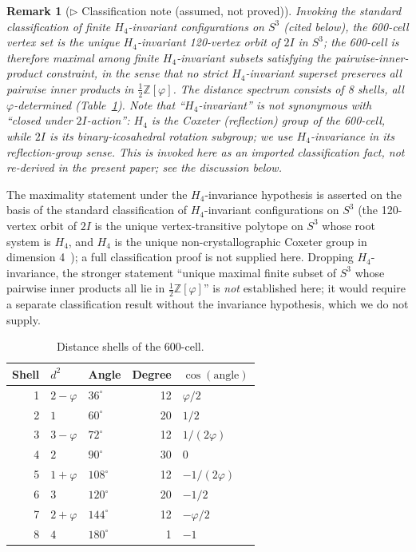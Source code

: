 \documentclass[12pt]{article}
\newtheorem{remark}[theorem]{Remark}
\newcommand{\phig}{\varphi}
\begin{document}
\begin{remark}[$\triangleright$ Classification note (assumed, not proved)]\label{cor:phi_determined}
Invoking the standard classification of finite $H_4$-invariant configurations on $S^3$ (cited below), the 600-cell vertex set is the \emph{unique $H_4$-invariant} 120-vertex orbit of $2I$ in $S^3$; the 600-cell is therefore maximal among finite $H_4$-invariant subsets satisfying the pairwise-inner-product constraint, in the sense that no strict $H_4$-invariant superset preserves all pairwise inner products in $\tfrac{1}{2}\mathbb{Z}[\phig]$. The distance spectrum consists of 8 shells, all $\phig$-determined (Table~\ref{tab:shells}). Note that ``$H_4$-invariant'' is \emph{not} synonymous with ``closed under $2I$-action'': $H_4$ is the Coxeter (reflection) group of the 600-cell, while $2I$ is its binary-icosahedral rotation subgroup; we use $H_4$-invariance in its reflection-group sense. This is invoked here as an imported classification fact, not re-derived in the present paper; see the discussion below.
\end{remark}

\noindent The maximality statement under the $H_4$-invariance hypothesis is asserted on the basis of the standard classification of $H_4$-invariant configurations on $S^3$ (the 120-vertex orbit of $2I$ is the unique vertex-transitive polytope on $S^3$ whose root system is $H_4$, and $H_4$ is the unique non-crystallographic Coxeter group in dimension 4~\citep[Ch.~8]{ConwaySloane1999}); a full classification proof is not supplied here. Dropping $H_4$-invariance, the stronger statement ``unique maximal finite subset of $S^3$ whose pairwise inner products all lie in $\tfrac{1}{2}\mathbb{Z}[\phig]$'' is \emph{not} established here; it would require a separate classification result without the invariance hypothesis, which we do not supply.

\begin{table}[ht]
\centering
\caption{Distance shells of the 600-cell.}
\label{tab:shells}
\begin{tabular}{@{}rllrl@{}}
\toprule
Shell & $d^2$ & Angle & Degree & $\cos(\text{angle})$ \\
\midrule
1 & $2 - \phig$ & $36^\circ$ & 12 & $\phig/2$ \\
2 & $1$ & $60^\circ$ & 20 & $1/2$ \\
3 & $3 - \phig$ & $72^\circ$ & 12 & $1/(2\phig)$ \\
4 & $2$ & $90^\circ$ & 30 & $0$ \\
5 & $1 + \phig$ & $108^\circ$ & 12 & $-1/(2\phig)$ \\
6 & $3$ & $120^\circ$ & 20 & $-1/2$ \\
7 & $2 + \phig$ & $144^\circ$ & 12 & $-\phig/2$ \\
8 & $4$ & $180^\circ$ & 1 & $-1$ \\
\bottomrule
\end{tabular}
\end{table}
\end{document}
